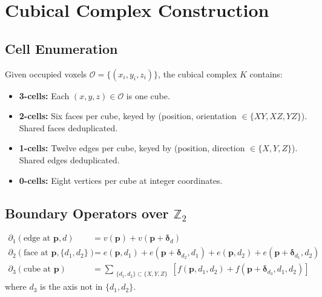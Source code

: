 \documentclass[11pt,a4paper]{article}
\theoremstyle{remark}
\begin{document}
\appendix

\section{Cubical Complex Construction}
\label{app:cubical}

\subsection{Cell Enumeration}

Given occupied voxels $\mathcal{O} = \{(x_i, y_i, z_i)\}$, the cubical complex $K$ contains:

\begin{itemize}[leftmargin=*]
    \item \textbf{3-cells:} Each $(x,y,z) \in \mathcal{O}$ is one cube.
    \item \textbf{2-cells:} Six faces per cube, keyed by (position, orientation $\in \{XY, XZ, YZ\}$). Shared faces deduplicated.
    \item \textbf{1-cells:} Twelve edges per cube, keyed by (position, direction $\in \{X, Y, Z\}$). Shared edges deduplicated.
    \item \textbf{0-cells:} Eight vertices per cube at integer coordinates.
\end{itemize}

\subsection{\texorpdfstring{Boundary Operators over $\mathbb{Z}_2$}{Boundary Operators over Z2}}

\begin{align}
    \partial_1(\text{edge at } \mathbf{p}, d) &= v(\mathbf{p}) + v(\mathbf{p} + \boldsymbol{\delta}_d) \\
    \partial_2(\text{face at } \mathbf{p}, \{d_1, d_2\}) &= e(\mathbf{p}, d_1) + e(\mathbf{p}+\boldsymbol{\delta}_{d_2}, d_1) + e(\mathbf{p}, d_2) + e(\mathbf{p}+\boldsymbol{\delta}_{d_1}, d_2) \\
    \partial_3(\text{cube at } \mathbf{p}) &= \sum_{\substack{\{d_1,d_2\} \subset \{X,Y,Z\}}} \left[f(\mathbf{p}, d_1, d_2) + f(\mathbf{p} + \boldsymbol{\delta}_{d_3}, d_1, d_2)\right]
\end{align}
where $d_3$ is the axis not in $\{d_1, d_2\}$.
\end{document}
